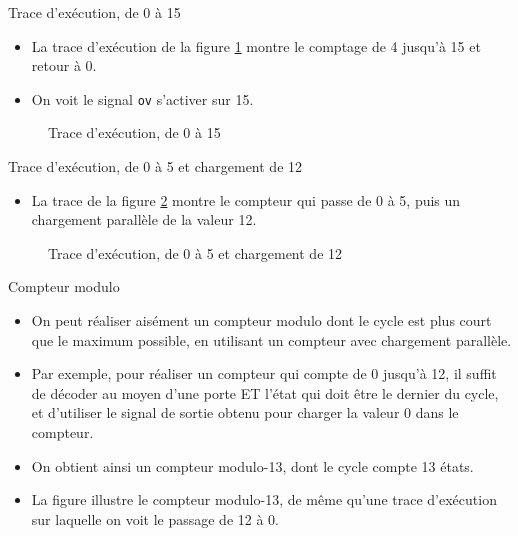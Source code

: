 \documentclass[presentation]{beamer}
\begin{document}
\begin{frame}[label={sec:org8c00afa},fragile]{Trace d'exécution, de 0 à 15}
 \begin{itemize}
\item La trace d’exécution de la figure \ref{fig:org6a34c49} montre le comptage de 4 jusqu'à 15 et retour à 0.

\item On voit le signal \texttt{ov} s'activer sur 15.
\end{itemize}

\begin{figure}[htbp]
\centering

\caption{\label{fig:org6a34c49}Trace d'exécution, de 0 à 15}
\end{figure}
\end{frame}

\begin{frame}[label={sec:org2a88d1e}]{Trace d'exécution, de 0 à 5 et chargement de 12}
\begin{itemize}
\item La trace de la figure \ref{fig:orgd20f418}  montre le compteur qui passe de 0 à 5, puis un chargement parallèle de la valeur 12.
\end{itemize}

\begin{figure}[htbp]
\centering

\caption{\label{fig:orgd20f418}Trace d'exécution, de 0 à 5 et chargement de 12}
\end{figure}
\end{frame}

\begin{frame}[label={sec:org215bf26}]{Compteur modulo}
\begin{itemize}
\item On peut réaliser aisément un compteur modulo dont le cycle est plus court que le maximum possible, en utilisant un compteur avec chargement parallèle.

\item Par exemple, pour réaliser un compteur qui compte de 0 jusqu'à 12, il suffit de décoder au moyen d'une porte ET l'état qui doit être le dernier du cycle, et d'utiliser le signal de sortie obtenu pour charger la valeur 0 dans le compteur.

\item On obtient ainsi un compteur modulo-13, dont le cycle compte 13 états.

\item La figure illustre le compteur modulo-13, de même qu'une trace d'exécution sur laquelle on voit le passage de 12 à 0.
\end{itemize}
\end{frame}
\end{document}
